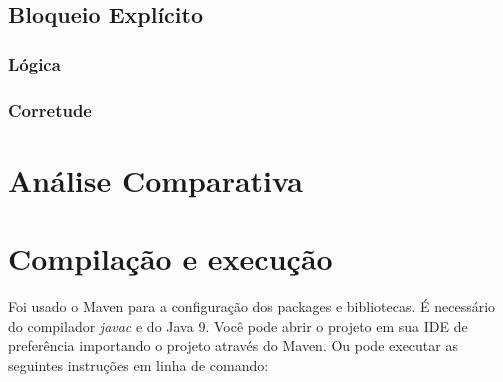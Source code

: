 \documentclass{article}
\newcommand\tab[1][1cm]{\hspace*{#1}}
\begin{document}
\subsection*{Bloqueio Explícito}

\subsubsection*{Lógica}
\tab 
\subsubsection*{Corretude}
\tab 


\section*{Análise Comparativa}
\tab 

\section*{Compilação e execução}
\tab Foi usado o Maven para a configuração dos packages e bibliotecas. É necessário do compilador \textit{javac} e do Java 9.
Você pode abrir o projeto em sua IDE  de preferência importando o projeto através do Maven. Ou pode executar as seguintes instruções em linha de comando:
\end{document}
